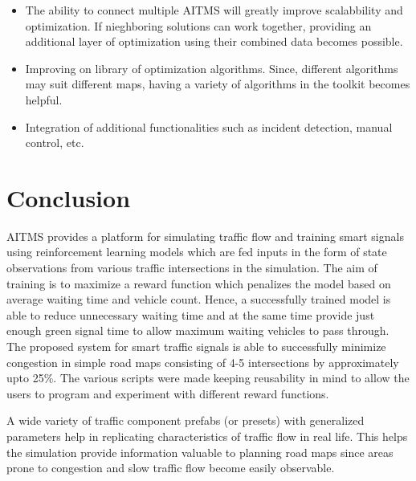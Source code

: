 \documentclass[openany,12pt]{report}
\begin{document}
	\begin{itemize}
		\item{The ability to connect multiple AITMS will greatly improve scalabbility and optimization. If nieghboring solutions can work together, providing an additional layer of optimization using their combined data becomes possible.}
		\item{Improving on library of optimization algorithms. Since, different algorithms may suit different maps, having a variety of algorithms in the toolkit becomes helpful.}
		\item{Integration of additional functionalities such as incident detection, manual control, etc.}
	\end{itemize}
	
	\chapter{Conclusion}
	\hspace*{0.5in}AITMS provides a platform for simulating traffic flow and training smart signals using reinforcement learning models which are fed inputs in the form of state observations from various traffic intersections in the simulation. The aim of training is to maximize a reward function which penalizes the model based on average waiting time and vehicle count. Hence, a successfully trained model is able to reduce unnecessary waiting time and at the same time provide just enough green signal time to allow maximum waiting vehicles to pass through. The proposed system for smart traffic signals is able to successfully minimize congestion in simple road maps consisting of 4-5 intersections by approximately upto 25\%. The various scripts were made keeping reusability in mind to allow the users to program and experiment with different reward functions.

\hspace*{0.5in}A wide variety of traffic component prefabs (or presets) with generalized parameters help in replicating characteristics of traffic flow in real life. This helps the simulation provide information valuable to planning road maps since areas prone to congestion and slow traffic flow become easily observable.
\end{document}
